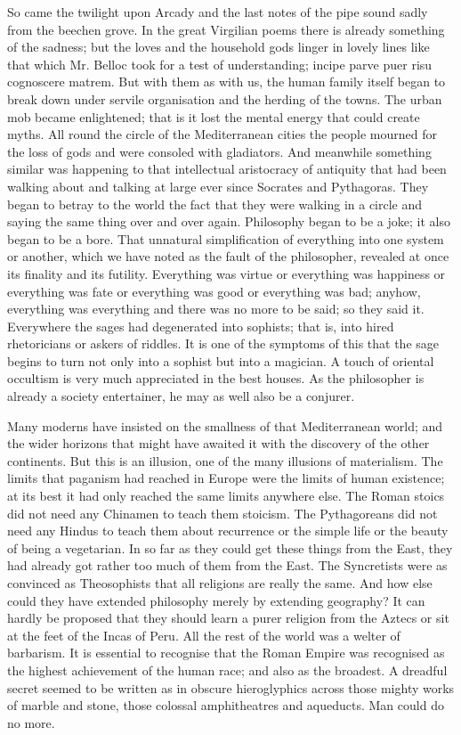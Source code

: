 So came the twilight upon Arcady and the last notes of the pipe sound sadly from the beechen grove. In the great Virgilian poems there is already something of the sadness; but the loves and the household gods linger in lovely lines like that which Mr. Belloc took for a test of understanding; incipe parve puer risu cognoscere matrem. But with them as with us, the human family itself began to break down under servile organisation and the herding of the towns. The urban mob became enlightened; that is it lost the mental energy that could create myths. All round the circle of the Mediterranean cities the people mourned for the loss of gods and were consoled with gladiators. And meanwhile something similar was happening to that intellectual aristocracy of antiquity that had been walking about and talking at large ever since Socrates and Pythagoras. They began to betray to the world the fact that they were walking in a circle and saying the same thing over and over again. Philosophy began to be a joke; it also began to be a bore. That unnatural simplification of everything into one system or another, which we have noted as the fault of the philosopher, revealed at once its finality and its futility. Everything was virtue or everything was happiness or everything was fate or everything was good or everything was bad; anyhow, everything was everything and there was no more to be said; so they said it. Everywhere the sages had degenerated into sophists; that is, into hired rhetoricians or askers of riddles. It is one of the symptoms of this that the sage begins to turn not only into a sophist but into a magician. A touch of oriental occultism is very much appreciated in the best houses. As the philosopher is already a society entertainer, he may as well also be a conjurer.

Many moderns have insisted on the smallness of that Mediterranean world; and the wider horizons that might have awaited it with the discovery of the other continents. But this is an illusion, one of the many illusions of materialism. The limits that paganism had reached in Europe were the limits of human existence; at its best it had only reached the same limits anywhere else. The Roman stoics did not need any Chinamen to teach them stoicism. The Pythagoreans did not need any Hindus to teach them about recurrence or the simple life or the beauty of being a vegetarian. In so far as they could get these things from the East, they had already got rather too much of them from the East. The Syncretists were as convinced as Theosophists that all religions are really the same. And how else could they have extended philosophy merely by extending geography? It can hardly be proposed that they should learn a purer religion from the Aztecs or sit at the feet of the Incas of Peru. All the rest of the world was a welter of barbarism. It is essential to recognise that the Roman Empire was recognised as the highest achievement of the human race; and also as the broadest. A dreadful secret seemed to be written as in obscure hieroglyphics across those mighty works of marble and stone, those colossal amphitheatres and aqueducts. Man could do no more.

